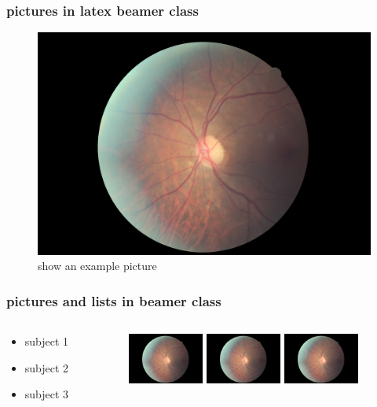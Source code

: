 \documentclass{beamer}
\begin{document}
\begin{frame}\frametitle{pictures in latex beamer class}
\begin{figure}
\includegraphics[scale=0.5]{pics/10_left.jpeg} 
\caption{show an example picture}
\end{figure}
\end{frame}


\begin{frame}
\frametitle{pictures and lists in beamer class}
\begin{columns}
\begin{column}{5cm}
\begin{itemize}
\item<1-> subject 1
\item<3-> subject 2
\item<5-> subject 3
\end{itemize}
\vspace{3cm} 
\end{column}
\begin{column}{5cm}
\begin{overprint}
\includegraphics<2>[width=2.5cm]{pics/10_left.jpeg}
\includegraphics<4>[width=2.5cm]{pics/10_left.jpeg}
\includegraphics<6>[width=2.5cm]{pics/10_left.jpeg}
\end{overprint}
\end{column}
\end{columns}
\end{frame}
\end{document}
